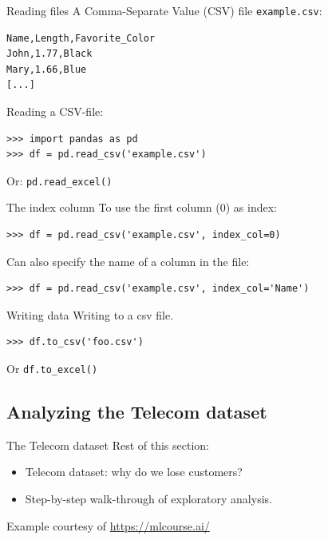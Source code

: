 \documentclass[aspectratio=169,usenames,dvipsnames]{beamer}
\begin{document}
\begin{frame}[fragile]{Reading files}
A Comma-Separate Value (CSV) file \texttt{example.csv}:

\begin{lstlisting}[style=plain]
Name,Length,Favorite_Color
John,1.77,Black
Mary,1.66,Blue
[...]
\end{lstlisting}

Reading a CSV-file:
\begin{lstlisting}
>>> import pandas as pd
>>> df = pd.read_csv('example.csv')
\end{lstlisting}

Or: \texttt{pd.read\_excel()}
\end{frame}

\begin{frame}[fragile]{The index column}
To use the first column (0) as index:
\begin{lstlisting}
>>> df = pd.read_csv('example.csv', index_col=0)
\end{lstlisting}

Can also specify the name of a column in the file:

\begin{lstlisting}
>>> df = pd.read_csv('example.csv', index_col='Name')
\end{lstlisting}
\end{frame}

\begin{frame}[fragile]{Writing data}
Writing to a csv file.

\begin{lstlisting}
>>> df.to_csv('foo.csv')
\end{lstlisting}
Or \texttt{df.to\_excel()}
\end{frame}



\subsection{Analyzing the Telecom dataset}
\begin{frame}{The Telecom dataset}
    Rest of this section:
    \begin{itemize}
        \item Telecom dataset: why do we lose customers?
        \item Step-by-step walk-through of exploratory analysis.
    \end{itemize}

    \vspace{1em}
    Example courtesy of \url{https://mlcourse.ai/}
\end{frame}
\end{document}
